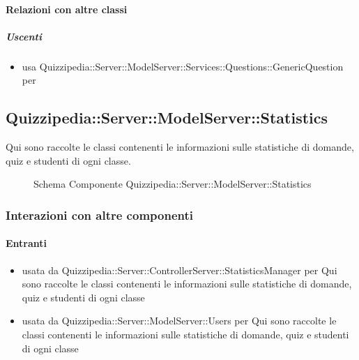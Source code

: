 \paragraph{Relazioni con altre classi}
\subparagraph{Uscenti}
\begin{itemize}
\item usa Quizzipedia::Server::ModelServer::Services::Questions::GenericQuestion per 
\end{itemize}
\subsection{Quizzipedia::Server::ModelServer::Statistics}
Qui sono raccolte le classi contenenti le informazioni sulle statistiche di domande, quiz e studenti di ogni classe.
\begin{figure}[H]
\centering
\noindent{}
\caption[Schema Componente Quizzipedia::Server::ModelServer::Statistics]{Schema Componente Quizzipedia::Server::ModelServer::Statistics}
\end{figure}
\subsubsection{Interazioni con altre componenti}
\paragraph{Entranti}
\begin{itemize}
\item usata da Quizzipedia::Server::ControllerServer::StatisticsManager per Qui sono raccolte le classi contenenti le informazioni sulle statistiche di domande, quiz e studenti di ogni classe
\item usata da Quizzipedia::Server::ModelServer::Users per Qui sono raccolte le classi contenenti le informazioni sulle statistiche di domande, quiz e studenti di ogni classe
\end{itemize}
